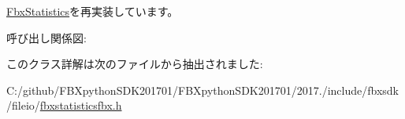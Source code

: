 \hyperlink{class_fbx_statistics_abd81e5b31d33546ad6ba5fa9af34c792}{Fbx\+Statistics}を再実装しています。

呼び出し関係図\+:


このクラス詳解は次のファイルから抽出されました\+:\begin{DoxyCompactItemize}
\item 
C\+:/github/\+F\+B\+Xpython\+S\+D\+K201701/\+F\+B\+Xpython\+S\+D\+K201701/2017./include/fbxsdk/fileio/\hyperlink{fbxstatisticsfbx_8h}{fbxstatisticsfbx.\+h}\end{DoxyCompactItemize}
